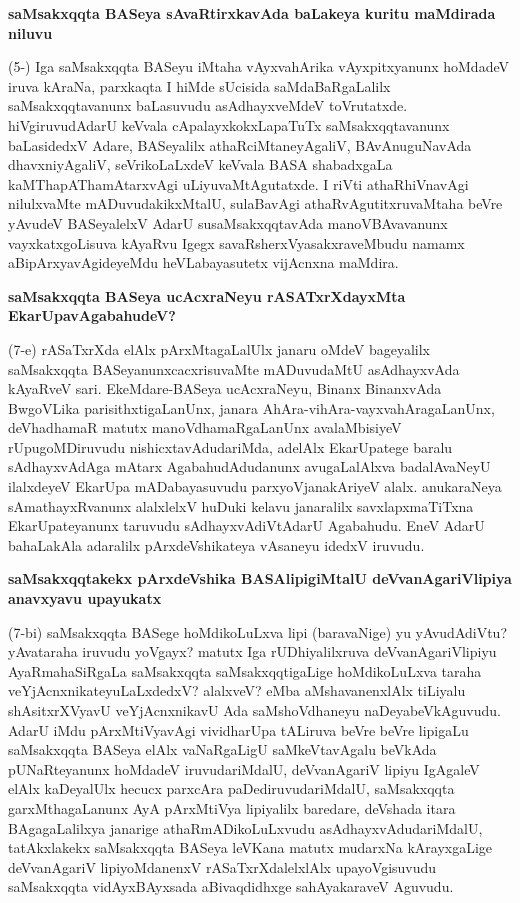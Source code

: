 \textbf{saMsakxqqta BASeya sAvaRtirxkavAda baLakeya kuritu maMdirada niluvu}

(5-) Iga saMsakxqqta BASeyu iMtaha vAyxvahArika vAyxpitxyanunx hoMdadeV iruva kAraNa, parxkaqta I hiMde sUcisida saMdaBaRgaLalilx saMsakxqqtavanunx baLasuvudu asAdhayxveMdeV toVrutatxde. hiVgiruvudAdarU keVvala cApalayxkokxLapaTuTx saMsakxqqtavanunx baLasidedxV Adare, BASeyalilx athaRciMtaneyAgaliV, BAvAnuguNavAda dhavxniyAgaliV, seVrikoLaLxdeV keVvala BASA shabadxgaLa kaMThapAThamAtarxvAgi uLiyuvaMtAgutatxde. I riVti athaRhiVnavAgi nilulxvaMte mADuvudakikxMtalU, sulaBavAgi athaRvAgutitxruvaMtaha beVre yAvudeV BASeyalelxV AdarU susaMsakxqqtavAda manoVBAvavanunx vayxkatxgoLisuva kAyaRvu Igegx savaRsherxVyasakxraveMbudu namamx aBipArxyavAgideyeMdu heVLabayasutetx vijAcnxna maMdira.

\textbf{saMsakxqqta BASeya ucAcxraNeyu rASATxrXdayxMta EkarUpavAgabahudeV?}

(7-e) rASaTxrXda elAlx pArxMtagaLalUlx janaru oMdeV bageyalilx saMsakxqqta BASeyanunxcacxrisuvaMte mADuvudaMtU asAdhayxvAda kAyaRveV sari. EkeMdare-BASeya ucAcxraNeyu, Binanx BinanxvAda BwgoVLika parisithxtigaLanUnx, janara AhAra-vihAra-vayxvahAragaLanUnx, deVhadhamaR matutx manoVdhamaRgaLanUnx avalaMbisiyeV rUpugoMDiruvudu nishicxtavAdudariMda, adelAlx EkarUpatege baralu sAdhayxvAdAga mAtarx AgabahudAdudanunx avugaLalAlxva badalAvaNeyU ilalxdeyeV EkarUpa mADabayasuvudu parxyoVjanakAriyeV alalx. anukaraNeya sAmathayxRvanunx alalxlelxV huDuki kelavu janaralilx savxlapxmaTiTxna EkarUpateyanunx taruvudu sAdhayxvAdiVtAdarU Agabahudu. EneV AdarU bahaLakAla adaralilx pArxdeVshikateya vAsaneyu idedxV iruvudu.

\textbf{saMsakxqqtakekx pArxdeVshika BASAlipigiMtalU deVvanAgariVlipiya anavxyavu upayukatx}

(7-bi) saMsakxqqta BASege hoMdikoLuLxva lipi (baravaNige) yu yAvudAdiVtu? yAvataraha iruvudu yoVgayx? matutx Iga rUDhiyalilxruva deVvanAgariVlipiyu AyaRmahaSiRgaLa saMsakxqqta saMsakxqqtigaLige hoMdikoLuLxva taraha veYjAcnxnikateyuLaLxdedxV? alalxveV? eMba aMshavanenxlAlx tiLiyalu shAsitxrXVyavU veYjAcnxnikavU Ada saMshoVdhaneyu naDeyabeVkAguvudu. AdarU iMdu pArxMtiVyavAgi vividharUpa tALiruva beVre beVre lipigaLu saMsakxqqta BASeya elAlx vaNaRgaLigU saMkeVtavAgalu beVkAda pUNaRteyanunx hoMdadeV iruvudariMdalU, deVvanAgariV lipiyu IgAgaleV elAlx kaDeyalUlx hecucx parxcAra paDediruvudariMdalU, saMsakxqqta garxMthagaLanunx AyA pArxMtiVya lipiyalilx baredare, deVshada itara BAgagaLalilxya janarige athaRmADikoLuLxvudu asAdhayxvAdudariMdalU, tatAkxlakekx saMsakxqqta
BASeya leVKana matutx mudarxNa kArayxgaLige deVvanAgariV lipiyoMdanenxV rASaTxrXdalelxlAlx upayoVgisuvudu saMsakxqqta vidAyxBAyxsada aBivaqdidhxge sahAyakaraveV Aguvudu. 

